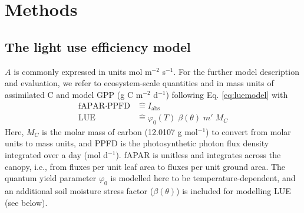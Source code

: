 \documentclass{myreport}
\begin{document}
\section{Methods}
\label{sec:methods}

\subsection{The light use efficiency model}
\label{sec:luemodel}
$A$ is commonly expressed in units mol m$^{-2}$ s$^{-1}$. For the further model description and evaluation, we refer to ecosystem-scale quantities and in mass units of assimilated C and model GPP (g C m$^{-2}$ d$^{-1}$) following Eq. \ref{eq:luemodel}
with 
\begin{align}
    \label{eq:iabs_identification}
    \text{fAPAR} \cdot \text{PPFD} &\mathrel{\widehat{=}} I_{\text{abs}} \\
    \label{eq:lue_identification}
    \text{LUE} &\mathrel{\widehat{=}} \varphi_0(T) \; \beta(\theta) \; m' \; M_C
\end{align}
Here, $M_C$ is the molar mass of carbon (12.0107 g mol$^{-1}$) to convert from molar units to mass units, and PPFD is the photosynthetic photon flux density integrated over a day (mol d$^{-1}$). fAPAR is unitless and integrates across the canopy, i.e., from fluxes per unit leaf area to fluxes per unit ground area. The quantum yield parameter $\varphi_0$ is modelled here to be temperature-dependent, and an additional soil moisture stress factor ($\beta (\theta)$) is included for modelling LUE (see below).
\end{document}
